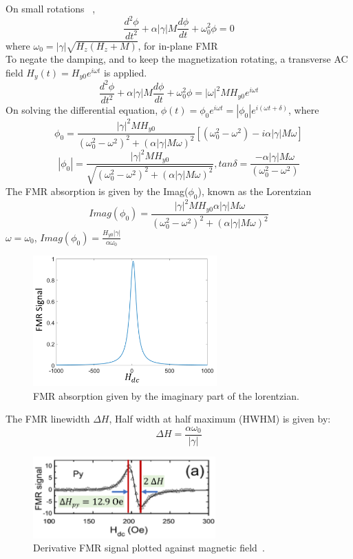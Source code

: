 \documentclass[12pt,a4paper,bold]{thesis}
\theoremstyle{thm}
\theoremstyle{definition}
\begin{document}
On small rotations ~\cite{RefWorks:814},
\[\frac{d^2\phi}{dt^2}+\alpha|\gamma|M\frac{d\phi}{dt}+\omega_0^2\phi=0\]
where $\omega_0=|\gamma|\sqrt{H_z(H_z+M)}$, for in-plane FMR\\
To negate the damping, and to keep the magnetization rotating, a transverse AC field $H_y(t)=H_{y0}e^{i\omega t}$ is applied.
\[\frac{d^2\phi}{dt^2}+\alpha|\gamma|M\frac{d\phi}{dt}+\omega_0^2\phi =|\omega|^2MH_{y0}e^{i\omega t} \]
On solving the differential equation, $\phi(t)=\phi_0e^{i\omega t}=|\phi_0|e^{i(\omega t+\delta)}$, where\\
\[\phi_0=\frac{|\gamma|^2MH_{y0}}{(\omega_0^2 - \omega^2)^2 + (\alpha|\gamma|M\omega)^2}[(\omega_0^2 - \omega^2)-i\alpha|\gamma|M\omega]\]
\[|\phi_0|=\frac{|\gamma|^2MH_{y0}}{\sqrt{(\omega_0^2 - \omega^2)^2 + (\alpha|\gamma|M\omega)^2}}, tan \delta = \frac{-\alpha|\gamma|M\omega}{(\omega_0^2 - \omega^2)}\]
The FMR absorption is given by the Imag($\phi_0$), known as the Lorentzian
\[Imag(\phi_0)=\frac{|\gamma|^2MH_{y0}\alpha|\gamma|M\omega}{(\omega_0^2 - \omega^2)^2 + (\alpha|\gamma|M\omega)^2}\]
 $\omega=\omega_0$, $Imag(\phi_0)=\frac {H_{y0}|\gamma|}{\alpha \omega_0}$\\
\begin{figure}[H]
	\centering
   \includegraphics[height=5cm]{Images/59.png} 
   \caption{FMR absorption given by the imaginary part of the lorentzian.}
\end{figure}
The FMR linewidth $\Delta H$, Half width at half maximum (HWHM) is given by:
\[\Delta H =\frac{\alpha\omega_0}{|\gamma|}\]
\begin{figure}[H]
	\centering
   \includegraphics[width=7cm]{Images/60.png} 
   \caption{Derivative FMR signal plotted against magnetic field~\cite{RefWorks:161}.}
\end{figure}
\pagebreak
\end{document}
